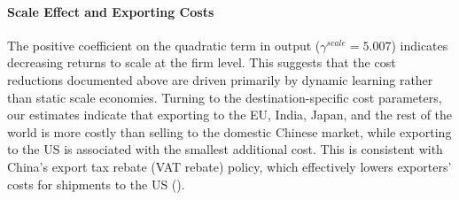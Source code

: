 \documentclass[12pt]{article}
\begin{document}
\paragraph{Scale Effect and Exporting Costs}
The positive coefficient on the quadratic term in output ($\gamma^{scale} = 5.007$) indicates decreasing returns to scale at the firm level. This suggests that the cost reductions documented above are driven primarily by dynamic learning rather than static scale economies. Turning to the destination-specific cost parameters, our estimates indicate that exporting to the EU, India, Japan, and the rest of the world is more costly than selling to the domestic Chinese market, while exporting to the US is associated with the smallest additional cost. This is consistent with China's export tax rebate (VAT rebate) policy, which effectively lowers exporters' costs for shipments to the US (\citealp{chandra2013vat}).
\end{document}

